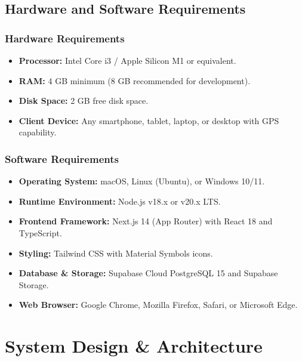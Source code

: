 \documentclass[12pt,a4paper]{report}
\begin{document}
\section{Hardware and Software Requirements}

\subsection{Hardware Requirements}
\begin{itemize}
    \item \textbf{Processor:} Intel Core i3 / Apple Silicon M1 or equivalent.
    \item \textbf{RAM:} 4 GB minimum (8 GB recommended for development).
    \item \textbf{Disk Space:} 2 GB free disk space.
    \item \textbf{Client Device:} Any smartphone, tablet, laptop, or desktop with GPS capability.
\end{itemize}

\subsection{Software Requirements}
\begin{itemize}
    \item \textbf{Operating System:} macOS, Linux (Ubuntu), or Windows 10/11.
    \item \textbf{Runtime Environment:} Node.js v18.x or v20.x LTS.
    \item \textbf{Frontend Framework:} Next.js 14 (App Router) with React 18 and TypeScript.
    \item \textbf{Styling:} Tailwind CSS with Material Symbols icons.
    \item \textbf{Database \& Storage:} Supabase Cloud PostgreSQL 15 and Supabase Storage.
    \item \textbf{Web Browser:} Google Chrome, Mozilla Firefox, Safari, or Microsoft Edge.
\end{itemize}

\newpage
\chapter{System Design \& Architecture}
\end{document}
